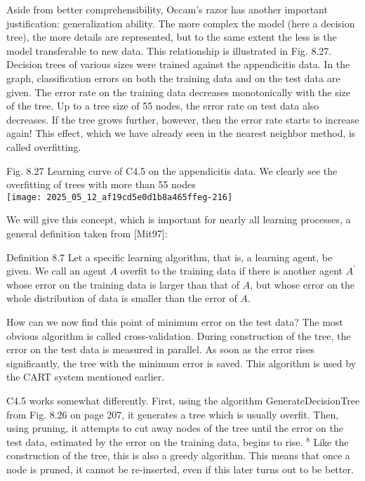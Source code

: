 \documentclass[10pt]{article}
\begin{document}
Aside from better comprehensibility, Occam's razor has another important justification: generalization ability. The more complex the model (here a decision tree), the more details are represented, but to the same extent the less is the model transferable to new data. This relationship is illustrated in Fig. 8.27. Decision trees of various sizes were trained against the appendicitis data. In the graph, classification errors on both the training data and on the test data are given. The error rate on the training data decreases monotonically with the size of the tree. Up to a tree size of 55 nodes, the error rate on test data also decreases. If the tree grows further, however, then the error rate starts to increase again! This effect, which we have already seen in the nearest neighbor method, is called overfitting.

Fig. 8.27 Learning curve of C4.5 on the appendicitis data. We clearly see the overfitting of trees with more than 55 nodes\\
\texttt{[image: 2025\_05\_12\_af19cd5e0d1b8a465ffeg-216]}

We will give this concept, which is important for nearly all learning processes, a general definition taken from [Mit97]:

Definition 8.7 Let a specific learning algorithm, that is, a learning agent, be given. We call an agent $A$ overfit to the training data if there is another agent $A^{\prime}$ whose error on the training data is larger than that of $A$, but whose error on the whole distribution of data is smaller than the error of $A$.

How can we now find this point of minimum error on the test data? The most obvious algorithm is called cross-validation. During construction of the tree, the error on the test data is measured in parallel. As soon as the error rises significantly, the tree with the minimum error is saved. This algorithm is used by the CART system mentioned earlier.

C4.5 works somewhat differently. First, using the algorithm GenerateDecisionTree from Fig. 8.26 on page 207, it generates a tree which is usually overfit. Then, using pruning, it attempts to cut away nodes of the tree until the error on the test data, estimated by the error on the training data, begins to rise. ${ }^{8}$ Like the construction of the tree, this is also a greedy algorithm. This means that once a node is pruned, it cannot be re-inserted, even if this later turns out to be better.
\end{document}
